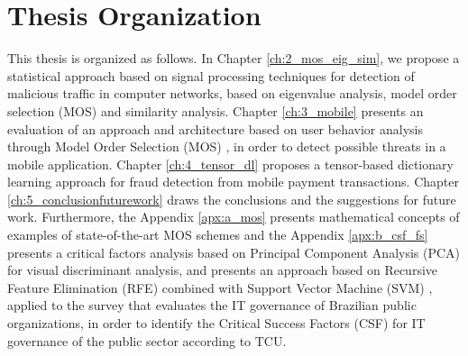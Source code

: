 \section{Thesis Organization}
\label{sc:organization}

This thesis is organized as follows. In Chapter \ref{ch:2_mos_eig_sim}, we propose a statistical approach based on signal processing techniques for detection of malicious traffic in computer networks, based on eigenvalue analysis, model order selection (MOS) and similarity analysis. Chapter \ref{ch:3_mobile} presents an evaluation of an approach and architecture based on user behavior analysis through Model Order Selection (MOS) \cite{tenorio2013greatest}, in order to detect possible threats in a mobile application. Chapter \ref{ch:4_tensor_dl} proposes a tensor-based dictionary learning approach for fraud detection from mobile payment transactions. Chapter \ref{ch:5_conclusionfuturework} draws the conclusions and the suggestions for future work. Furthermore, the Appendix \ref{apx:a_mos} presents mathematical concepts of examples of state-of-the-art MOS schemes and the Appendix \ref{apx:b_csf_fs} presents a critical factors analysis based on Principal Component Analysis (PCA) for visual discriminant analysis, and presents an approach based on Recursive Feature Elimination (RFE) combined with Support Vector Machine (SVM) \cite{hearst1998support}, applied to the survey that evaluates the IT governance of Brazilian public organizations, in order to identify the Critical Success Factors (CSF) for IT governance of the public sector according to TCU.